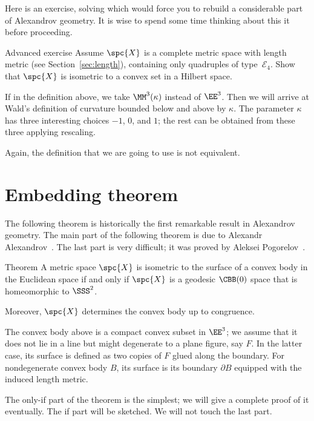 Here is an exercise, solving which would force you to rebuild a considerable part of Alexandrov geometry.
It is wise to spend some time thinking about this it before proceeding.

\begin{thm}{Advanced exercise}\label{ex:convex-set}
Assume $\spc{X}$ is a complete metric space with length metric (see Section~\ref{sec:length}), 
containing only quadruples of type~$\mathcal{E}_4$.
Show that $\spc{X}$ is isometric to a convex set in a Hilbert space.
\end{thm}

If in the definition above, we take $\MM^3(\kappa)$ instead of $\EE^3$.
Then we will arrive at Wald's definition of curvature bounded below and above by $\kappa$.
The parameter $\kappa$ has three interesting choices $-1$, $0$, and $1$;
the rest can be obtained from these three applying rescaling.

Again, the definition that we are going to use is not equivalent.


\section{Embedding theorem}

The following theorem is historically the first remarkable result in Alexandrov geometry.
The main part of the following theorem is due to Alexandr Alexandrov~\cite{alexandrov-1948}.
The last part is very difficult; it was proved by Aleksei Pogorelov~\cite{pogorelov}.

\begin{thm}{Theorem}\label{thm:alexandrov+pogorelov}
A metric space $\spc{X}$ is isometric to the surface of a convex body in the Euclidean space if and only if $\spc{X}$ is a geodesic $\CBB(0)$ space that is homeomorphic to $\SSS^2$.

Moreover, $\spc{X}$ determines the convex body up to congruence.
\end{thm}

The convex body above is a compact convex subset in $\EE^3$;
we assume that it does not lie in a line but might degenerate to a plane figure, say $F$.
In the latter case, its surface is defined as two copies of $F$ glued along the boundary.
For nondegenerate convex body $B$, its surface is its boundary $\partial B$ equipped with the induced length metric. 

The only-if part of the theorem is the simplest; we will give a complete proof of it eventually.
The if part will be sketched.
We will not touch the last part.
